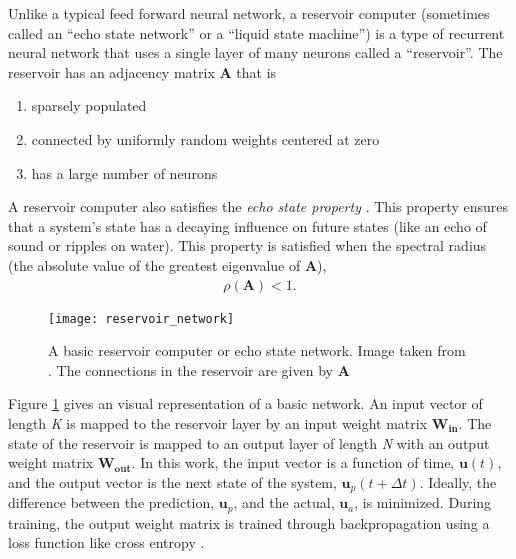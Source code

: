 Unlike a typical feed forward neural network, a reservoir computer (sometimes
called an ``echo state network'' or a ``liquid state machine'') is a type of
recurrent neural network that uses a single layer of many neurons called a
``reservoir''. The reservoir has an adjacency matrix $\bm{A}$ that is
\begin{enumerate}
	\item sparsely populated
	\item connected by uniformly random weights centered at zero
	\item has a large number of neurons
\end{enumerate}
A reservoir computer also satisfies the \textit{echo state property}
\cite{pathak_model-free_2018, lukosevicius_reservoir_2009}. This
property ensures that a system's state has a decaying influence on future states
(like an echo of sound or ripples on water). This property is satisfied when the
spectral radius (the absolute value of the greatest eigenvalue of
$\bm{A}$)\cite{lukosevicius_reservoir_2009},
\begin{align}
	\rho(\bm{A}) < 1.
\end{align}

\begin{figure}[H]
	\texttt{[image: reservoir\_network]}
	\caption{A basic reservoir computer or echo state network. Image taken from
	\cite{chouikhi_genesis_2018}. The connections in the reservoir are given by
	$\bm{A}$}
	\label{fig:RCmodel}
\end{figure}

Figure \ref{fig:RCmodel} gives an visual representation of a basic network. An
input vector of length \textit{K} is mapped to the reservoir layer by an input
weight matrix $\bm{W_{in}}$. The state of the reservoir is mapped to an output
layer of length \textit{N} with an output weight matrix $\bm{W_{out}}$. In this
work, the input vector is a function of time, $\bm{u}(t)$, and the output
vector is the next state of the system, $\bm{u}_p(t+\Delta t)$. Ideally, the
difference between the prediction, $\bm{u}_p$, and the actual, $\bm{u}_a$, is
minimized. During training, the output weight matrix is trained through
backpropagation using a loss function like cross entropy
\cite{pathak_model-free_2018, vlachas_backpropagation_2020}.

